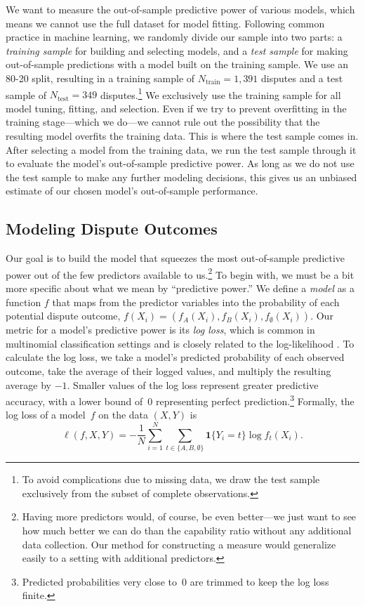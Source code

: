 We want to measure the out-of-sample predictive power of various models, which means we cannot use the full dataset for model fitting.
Following common practice in machine learning, we randomly divide our sample into two parts: a \emph{training sample} for building and selecting models, and a \emph{test sample} for making out-of-sample predictions with a model built on the training sample.
We use an 80-20 split, resulting in a training sample of $N_{\text{train}} = 1{,}391$ disputes and a test sample of $N_{\text{test}} = 349$ disputes.\footnote{
  To avoid complications due to missing data, we draw the test sample exclusively from the subset of complete observations.
}
We exclusively use the training sample for all model tuning, fitting, and selection.
Even if we try to prevent overfitting in the training stage---which we do---we cannot rule out the possibility that the resulting model overfits the training data.
This is where the test sample comes in.
After selecting a model from the training data, we run the test sample through it to evaluate the model's out-of-sample predictive power.
As long as we do not use the test sample to make any further modeling decisions, this gives us an unbiased estimate of our chosen model's out-of-sample performance.

\subsection{Modeling Dispute Outcomes}

Our goal is to build the model that squeezes the most out-of-sample predictive power out of the few predictors available to us.\footnote{
  Having more predictors would, of course, be even better---we just want to see how much better we can do than the capability ratio without any additional data collection.
  Our method for constructing a measure would generalize easily to a setting with additional predictors.
}
To begin with, we must be a bit more specific about what we mean by ``predictive power.''
We define a \emph{model} as a function $f$ that maps from the predictor variables into the probability of each potential dispute outcome, $f(X_i) = (f_A(X_i), f_B(X_i), f_{\emptyset}(X_i))$.
Our metric for a model's predictive power is its \emph{log loss}, which is common in multinomial classification settings and is closely related to the log-likelihood \citep[221]{Hastie:2009wpa}.
To calculate the log loss, we take a model's predicted probability of each observed outcome, take the average of their logged values, and multiply the resulting average by $-1$.
Smaller values of the log loss represent greater predictive accuracy, with a lower bound of~$0$ representing perfect prediction.\footnote{
  Predicted probabilities very close to~0 are trimmed to keep the log loss finite.
}
Formally, the log loss of a model~$f$ on the data $(X, Y)$ is
\begin{equation}
  \label{eq:log-loss}
  \ell(f, X, Y)
  =
  - \frac{1}{N} \sum_{i = 1}^{N} \sum_{t \in \{A, B, \emptyset\}}
  \mathbf{1} \{Y_i = t\} \log f_t(X_i).
\end{equation}

